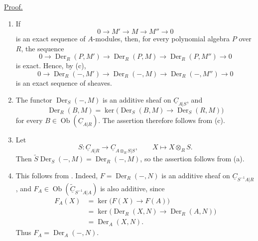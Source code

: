\underline{Proof.}

\begin{enumerate}[label=(\arabic*)]
\item If
\[
 0\longrightarrow M'\longrightarrow M\longrightarrow M''
 \longrightarrow0
\]
is an exact sequence of $A$-modules, then, for every polynomial
algebra $P$ over $R$, the sequence
\[
 0\longrightarrow\operatorname{Der}_R(P,M')
 \longrightarrow\operatorname{Der}_R(P,M)
 \longrightarrow\operatorname{Der}_R(P,M'')
 \longrightarrow0
\]
is exact. Hence, by (c),
\[
 0\longrightarrow\operatorname{Der}_R(-,M')
 \longrightarrow\operatorname{Der}_R(-,M)
 \longrightarrow\operatorname{Der}_R(-,M'')
 \longrightarrow0
\]
is an exact sequence of sheaves.

\item The functor $\operatorname{Der}_S(-,M)$ is an additive sheaf
on $\underline C_{A|S}$, and
\[
 \operatorname{Der}_R(B,M)
 =\ker\bigl(\operatorname{Der}_S(B,M)
 \longrightarrow\operatorname{Der}_S(R,M)\bigr)
\]
for every $B\in\operatorname{Ob}(\underline C_{A|R})$.
The assertion therefore follows from (c).

\item Let
\[
 S:\underline C_{A|R}\longrightarrow
 \underline C_{A\otimes_RS|S},
 \qquad X\longmapsto X\otimes_RS.
\]
Then
$\widetilde S\operatorname{Der}_S(-,M)
=\operatorname{Der}_R(-,M)$, so the assertion follows from (a).


\item This follows from . Indeed,
$F=\operatorname{Der}_R(-,N)$ is an additive sheaf on
$\underline C_{S^{-1}A|R}$, and
$F_A\in\operatorname{Ob}
(\widetilde{\underline C}_{S^{-1}A|A})$ is also additive, since
\begin{align*}
 F_A(X)
 &=\ker\bigl(F(X)\longrightarrow F(A)\bigr)\\
 &=\ker\bigl(\operatorname{Der}_R(X,N)
   \longrightarrow\operatorname{Der}_R(A,N)\bigr)\\
 &=\operatorname{Der}_A(X,N).
\end{align*}
Thus $F_A=\operatorname{Der}_A(-,N)$.


\end{enumerate}
